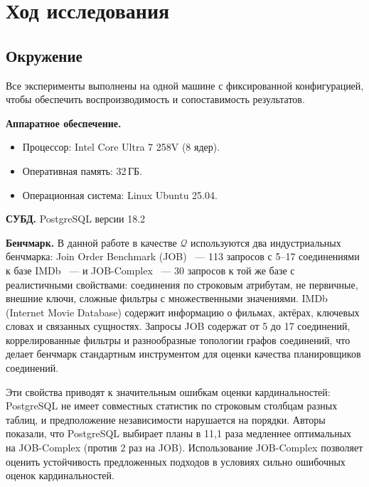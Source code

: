 \section{Ход исследования}

\subsection{Окружение}



Все эксперименты выполнены на одной машине с фиксированной конфигурацией,
чтобы обеспечить воспроизводимость и сопоставимость результатов.
\par

\textbf{Аппаратное обеспечение.}
\begin{itemize}
    \item Процессор: Intel Core Ultra 7 258V (8 ядер).
    \item Оперативная память: 32\,ГБ.
    \item Операционная система: Linux Ubuntu 25.04.
\end{itemize}

\textbf{СУБД.} PostgreSQL версии 18.2
\par

\textbf{Бенчмарк.}
В данной работе в качестве $\mathcal{Q}$ используются два индустриальных бенчмарка:
Join Order Benchmark (JOB) \cite{HowGoodJournal}~--- 113 запросов
с 5--17 соединениями к базе IMDb ~--- и JOB-Complex \cite{JOBComplex}~--- 30 запросов
к той же базе с реалистичными свойствами: соединения по строковым атрибутам, не первичные, внешние ключи, 
сложные фильтры с множественными значениями.
IMDb (Internet Movie Database) содержит информацию о фильмах,
актёрах, ключевых словах и связанных сущностях.
Запросы JOB содержат от 5 до 17 соединений, коррелированные фильтры
и разнообразные топологии графов соединений,
что делает бенчмарк стандартным инструментом для оценки качества
планировщиков соединений.
\par

Эти свойства приводят к значительным ошибкам оценки кардинальностей:
PostgreSQL не имеет совместных статистик по строковым столбцам разных таблиц,
и предположение независимости нарушается на порядки.
Авторы \cite{JOBComplex} показали, что PostgreSQL выбирает планы
в 11{,}1 раза медленнее оптимальных на JOB-Complex (против 2 раз на JOB).
Использование JOB-Complex позволяет оценить устойчивость предложенных подходов
в условиях сильно ошибочных оценок кардинальностей.
\par

